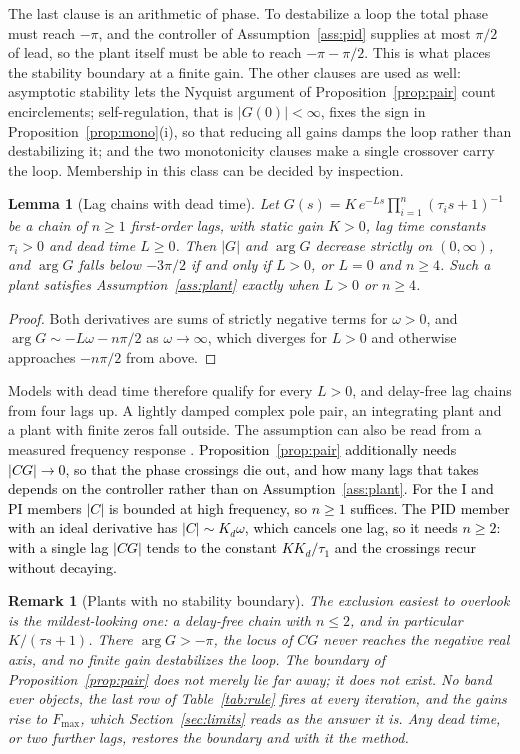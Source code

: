 \documentclass[final,3p,times,twocolumn]{elsarticle}
\newcommand{\fix}[1]{#1}  %
\newcommand{\new}[1]{\textcolor{black}{#1}}  %
\newtheorem{lemma}{Lemma}
\newtheorem{remark}{Remark}
\begin{document}
\fix{The last clause is an arithmetic of phase. To destabilize a loop
the total phase must reach $-\pi$, and the controller of
Assumption~\ref{ass:pid} supplies at most $\pi/2$ of lead, so the plant
itself must be able to reach $-\pi-\pi/2$. This is what places the
stability boundary at a finite gain. The other clauses are used as well: asymptotic
stability lets the Nyquist argument of Proposition~\ref{prop:pair} count
encirclements; self-regulation, that is $|G(0)| < \infty$, fixes the sign
in Proposition~\ref{prop:mono}(i), so that reducing all gains damps the
loop rather than destabilizing it; and the two monotonicity clauses make
a single crossover carry the loop. Membership in this class can be
decided by inspection.}
\begin{lemma}[Lag chains with dead time]\label{lem:class}
Let $G(s) = K\,e^{-Ls}\prod_{i=1}^{n}(\tau_i s+1)^{-1}$ be a chain of
$n \ge 1$ first-order lags, with static gain $K>0$, lag time constants
$\tau_i>0$ and dead time $L\ge 0$. Then $|G|$ and $\arg G$ decrease
strictly on $(0,\infty)$, and $\arg G$ falls below $-3\pi/2$ if and only
if $L>0$, or $L=0$ and $n\ge 4$. Such a plant satisfies
Assumption~\ref{ass:plant} exactly when $L>0$ or $n\ge 4$.
\end{lemma}

\begin{proof}
\fix{Both derivatives are sums of strictly negative terms for
$\omega>0$, and $\arg G \sim -L\omega - n\pi/2$ as $\omega\to\infty$,
which diverges for $L>0$ and otherwise approaches $-n\pi/2$ from
above.}
\end{proof}

\fix{Models with dead time therefore qualify for every $L>0$, and
delay-free lag chains from four lags up. A lightly damped complex pole
pair, an integrating plant and a plant with finite zeros fall outside.
The assumption can also be read from a measured frequency response
\cite{SchlegelCech2005,Schlegel2002}.}
\new{Proposition~\ref{prop:pair} additionally needs $|CG| \to 0$, so
that the phase crossings die out, and how many lags that takes depends
on the controller rather than on Assumption~\ref{ass:plant}. For the I
and PI members $|C|$ is bounded at high frequency, so $n \ge 1$
suffices. The PID member with an ideal derivative has
$|C| \sim K_d\omega$, which cancels one lag, so it needs $n \ge 2$: with
a single lag $|CG|$ tends to the constant $K K_d/\tau_1$ and the
crossings recur without decaying.}

\begin{remark}[Plants with no stability boundary]\label{rem:ladder}
The exclusion easiest to overlook is the mildest-looking one: a
delay-free chain with $n \le 2$, and in particular $K/(\tau s + 1)$.
There $\arg G > -\pi$, the locus of $CG$ never reaches the negative real
axis, and no finite gain destabilizes the loop. The boundary of
Proposition~\ref{prop:pair} does not merely lie far away; it does not
exist. No band ever objects, the
last row of Table~\ref{tab:rule} fires at every iteration, and the gains
rise to $F_{\max}$, which Section~\ref{sec:limits} reads as the answer
it is. Any dead time, or two further lags, restores the boundary and
with it the method.
\end{remark}
\end{document}
